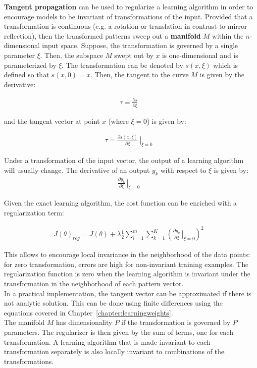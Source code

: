 \documentclass{report}
\begin{document}
{\bf Tangent propagation} can be used to regularize a learning algorithm in order to encourage models to be invariant of transformations of the input.
Provided that a transformation is continuous (e.g. a rotation or translation in contrast to mirror reflection), then the transformed patterns sweep out a {\bf manifold} $M$ within the $n$-dimensional input space.
Suppose, the transformation is governed by a single parameter $\xi$.
Then, the subspace $M$ swept out by $x$ is one-dimensional and is parameterized by $\xi$.
The transformation can be denoted by $s(x,\xi)$ which is defined so that $s(x,0)=x$.
Then, the tangent to the curve $M$ is given by the derivative:

\begin{align*}
\tau = \frac{\partial s}{\partial \xi}
\end{align*}

and the tangent vector at point $x$ (where $\xi=0$) is given by:

\begin{align*}
\tau = \frac{\partial s(x,\xi)}{\partial \xi}\left.{\!\!\frac{}{}}\right |_{\xi=0}
\end{align*}

Under a transformation of the input vector, the output of a learning algorithm will usually change.
The derivative of an output $y_k$ with respect to $\xi$ is given by:
\begin{align*}
\frac{\partial y_k}{\partial \xi}\left.{\!\!\frac{}{}}\right |_{\xi=0}
\end{align*}

Given the exact learning algorithm, the cost function can be enriched with a regularization term:

\begin{align*}
J(\theta)_{reg} = J(\theta) + \lambda \frac{1}{2} \sum_{i=1}^{m} \sum_{k=1}^{K} (\frac{\partial y_k}{\partial \xi}\left.{\!\!\frac{}{}}\right |_{\xi=0})^2
\end{align*}

This allows to encourage local invariance in the neighborhood of the data points: for zero transformation, errors are high for non-invariant training examples.
The regularization function is zero when the learning algorithm is invariant under the transformation in the neighborhood of each pattern vector.
\\
In a practical implementation, the tangent vector can be approximated if there is not analytic solution.
This can be done using finite differences using the equations covered in Chapter~\ref{chapter:learningweights}.
\\
The manifold $M$ has dimensionality $P$ if the transformation is governed by $P$ parameters.
The regularizer is then given by the sum of terms, one for each transformation.
A learning algorithm that is made invariant to each transformation separately is also locally invariant to combinations of the transformations.
\end{document}

